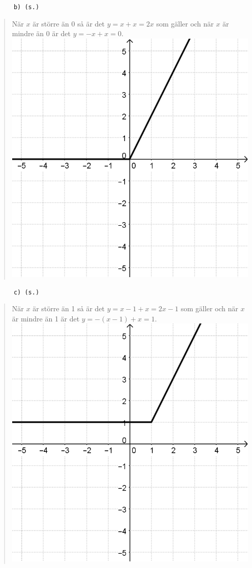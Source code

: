 \documentclass[a4paper]{article}
\newcommand{\tskcol}[1]{\textcolor{tskcol}{#1}}
\begin{document}
	\texttt{\tskcol{~~~~~~b) (s.)}}
	\begin{quotation}
		\noindent
		När $x$ är större än 0 så är det $y=x+x=2x$ som gäller och när $x$ är mindre än 0 är det $y=-x+x=0$. \\
		\includegraphics[scale=0.2]{images/520b.png}
	\end{quotation}
	
	\texttt{\tskcol{~~~~~~c) (s.)}}
	\begin{quotation}
		\noindent
		När $x$ är större än 1 så är det $y=x-1+x=2x-1$ som gäller och när $x$ är mindre än 1 är det $y=-(x-1)+x=1$. \\
		\includegraphics[scale=0.2]{images/520c.png}
	\end{quotation}
	
\end{document}
